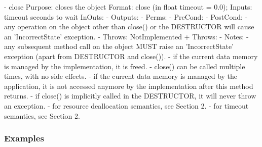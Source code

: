 \begin{myspec}
 
    - close
      Purpose:  closes the object
      Format:   close              (in  float timeout = 0.0);
      Inputs:   timeout             seconds to wait
      InOuts:   -
      Outputs:  -
      Perms:    -
      PreCond:  -
      PostCond: - any operation on the object other than 
                  close() or the DESTRUCTOR will cause 
                  an 'IncorrectState' exception.
-     Throws:   NotImplemented
+     Throws:   -
      Notes:    - any subsequent method call on the object
                  MUST raise an 'IncorrectState' exception
                  (apart from DESTRUCTOR and close()).
                - if the current data memory is managed by the
                  implementation, it is freed.
                - close() can be called multiple times, with no
                  side effects.
                - if the current data memory is managed by the
                  application, it is not accessed anymore by the
                  implementation after this method returns.
                - if close() is implicitly called in the
                  DESTRUCTOR, it will never throw an exception.
                - for resource deallocation semantics, see 
                  Section 2.
                - for timeout semantics, see Section 2.
 \end{myspec}
 
 
 \subsubsection{Examples}
 
